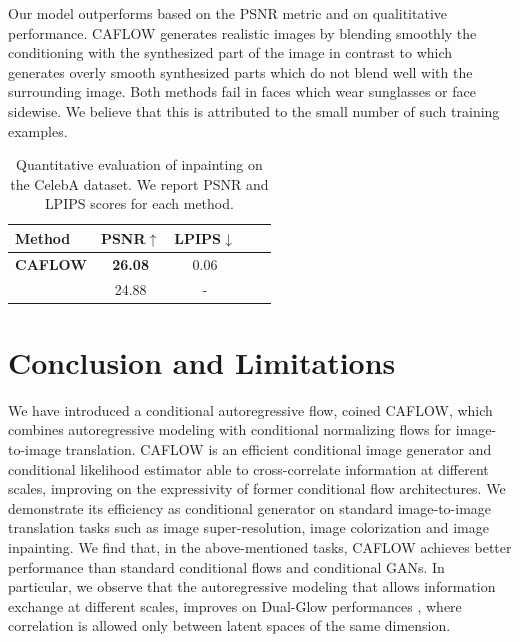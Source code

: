Our model outperforms \cite{cGLOW} based on the PSNR metric and on qualititative performance. CAFLOW generates realistic images by blending smoothly the conditioning with the synthesized part of the image in contrast to \cite{cGLOW} which generates overly smooth synthesized parts which do not blend well with the surrounding image. Both methods fail in faces which wear sunglasses or face sidewise. We believe that this is attributed to the small number of such training examples.

\begin{table}[h!]
    \centering
    \caption{Quantitative evaluation of inpainting on the CelebA dataset. We report PSNR and LPIPS scores for each method.}\label{ch1:quantitative-evaluation-inpainting}
    \setlength{\tabcolsep}{3pt}
    \begin{tabular}{l|cccc}
     Method  &  PSNR$\uparrow$  &   LPIPS$\downarrow$    \\
    
    \midrule
      \textbf{CAFLOW} &  \textbf{26.08} & 0.06  \\
      \cite{cGLOW} & 24.88 & -
        
    \end{tabular}
    \end{table}

\section{Conclusion and Limitations}\label{ch1:sec:conclusions}

We have introduced a conditional autoregressive flow, coined CAFLOW, which combines autoregressive modeling with conditional normalizing flows for image-to-image translation. CAFLOW is an efficient conditional image generator and conditional likelihood estimator able to cross-correlate information at different scales, improving on the expressivity of former conditional flow architectures. 
We demonstrate its efficiency as conditional generator on standard image-to-image translation tasks such as image super-resolution, image colorization and image inpainting. We find that, in the above-mentioned tasks, CAFLOW achieves better performance than standard conditional flows and conditional GANs. In particular, we observe that the autoregressive modeling that allows information exchange at different scales, improves on Dual-Glow performances \cite{Dual-Glow}, where correlation is allowed only between latent spaces of the same dimension.

